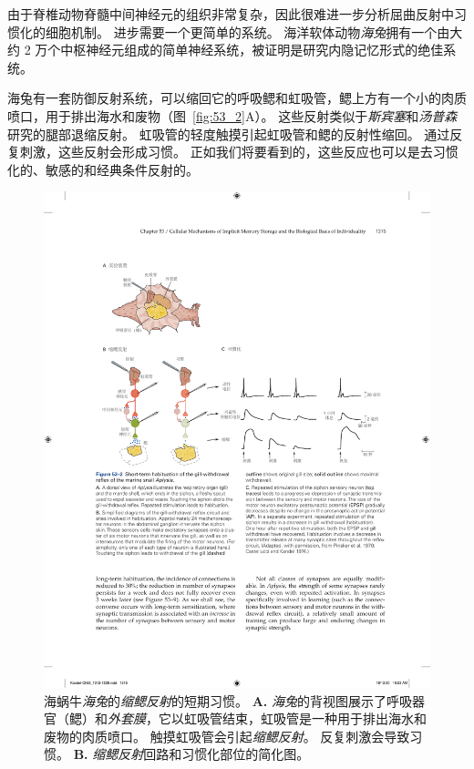 由于脊椎动物脊髓中间神经元的组织非常复杂，因此很难进一步分析屈曲反射中习惯化的细胞机制。
进步需要一个更简单的系统。
海洋软体动物\textit{海兔}拥有一个由大约 2 万个中枢神经元组成的简单神经系统，被证明是研究内隐记忆形式的绝佳系统。


海兔有一套防御反射系统，可以缩回它的呼吸鳃和虹吸管，鳃上方有一个小的肉质喷口，用于排出海水和废物（图~\ref{fig:53_2}A）。
这些反射类似于\textit{斯宾塞}和\textit{汤普森}研究的腿部退缩反射。
虹吸管的轻度触摸引起虹吸管和鳃的反射性缩回。
通过反复刺激，这些反射会形成习惯。
正如我们将要看到的，这些反应也可以是去习惯化的、敏感的和经典条件反射的。


\begin{figure}[htbp]
	\centering
	\includegraphics[width=1.0\linewidth]{chap53/fig_53_2}
	\caption{海蜗牛\textit{海兔}的\textit{缩鳃反射}的短期习惯。
		\textbf{A.} \textit{海兔}的背视图展示了呼吸器官（鳃）和\textit{外套膜}，它以虹吸管结束，虹吸管是一种用于排出海水和废物的肉质喷口。
		触摸虹吸管会引起\textit{缩鳃反射}。
		反复刺激会导致习惯。
		\textbf{B.} \textit{缩鳃反射}回路和习惯化部位的简化图。
}
\end{figure}
